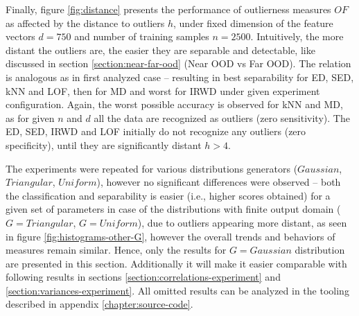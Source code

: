 Finally, figure \ref{fig:distance} presents the performance of outlierness measures $OF$ as affected by the distance to outliers $h$, under fixed dimension of the feature vectors $d = 750$ and number of training samples $n = 2500$. Intuitively, the more distant the outliers are, the easier they are separable and detectable, like discussed in section \ref{section:near-far-ood} (Near OOD vs Far OOD). The relation is analogous as in first analyzed case – resulting in best separability for ED, SED, kNN and LOF, then for MD and worst for IRWD under given experiment configuration. Again, the worst possible accuracy is observed for kNN and MD, as for given $n$ and $d$ all the data are recognized as outliers (zero sensitivity). The ED, SED, IRWD and LOF initially do not recognize any outliers (zero specificity), until they are significantly distant $h > 4$.

The experiments were repeated for various distributions generators ($Gaussian$, $Triangular$, $Uniform$), however no significant differences were observed – both the classification and separability is easier (i.e., higher scores obtained) for a given set of parameters in case of the distributions with finite output domain ($G = Triangular$, $G = Uniform$), due to outliers appearing more distant, as seen in figure \ref{fig:histograms-other-G}, however the overall trends and behaviors of measures remain similar. Hence, only the results for $G = Gaussian$ distribution are presented in this section. Additionally it will make it easier comparable with following results in sections \ref{section:correlations-experiment} and \ref{section:variances-experiment}. All omitted results can be analyzed in the tooling described in appendix \ref{chapter:source-code}.

